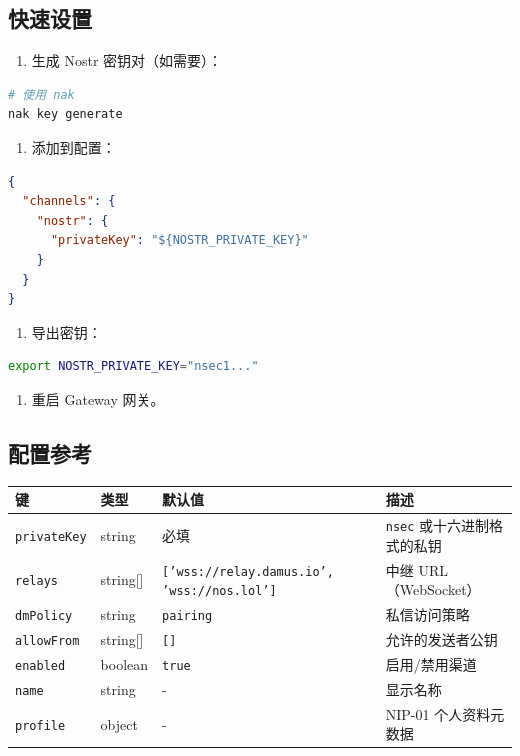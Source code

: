 \subsection{快速设置}


\begin{enumerate}
  \item 生成 Nostr 密钥对（如需要）：
\end{enumerate}


\begin{lstlisting}[language=bash]
# 使用 nak
nak key generate
\end{lstlisting}


\begin{enumerate}
  \item 添加到配置：
\end{enumerate}


\begin{lstlisting}[language=json]
{
  "channels": {
    "nostr": {
      "privateKey": "${NOSTR_PRIVATE_KEY}"
    }
  }
}
\end{lstlisting}


\begin{enumerate}
  \item 导出密钥：
\end{enumerate}


\begin{lstlisting}[language=bash]
export NOSTR_PRIVATE_KEY="nsec1..."
\end{lstlisting}


\begin{enumerate}
  \item 重启 Gateway 网关。
\end{enumerate}


\subsection{配置参考}



\begin{table}[h]
\centering
\small
\begin{tabular}{|l|l|l|l|}
\hline
键 & 类型 & 默认值 & 描述 \\
\hline
\texttt{privateKey} & string & 必填 & \texttt{nsec} 或十六进制格式的私钥 \\
\hline
\texttt{relays} & string[] & \texttt{['wss://relay.damus.io', 'wss://nos.lol']} & 中继 URL（WebSocket） \\
\hline
\texttt{dmPolicy} & string & \texttt{pairing} & 私信访问策略 \\
\hline
\texttt{allowFrom} & string[] & \texttt{[]} & 允许的发送者公钥 \\
\hline
\texttt{enabled} & boolean & \texttt{true} & 启用/禁用渠道 \\
\hline
\texttt{name} & string & - & 显示名称 \\
\hline
\texttt{profile} & object & - & NIP-01 个人资料元数据 \\
\hline
\end{tabular}
\end{table}



